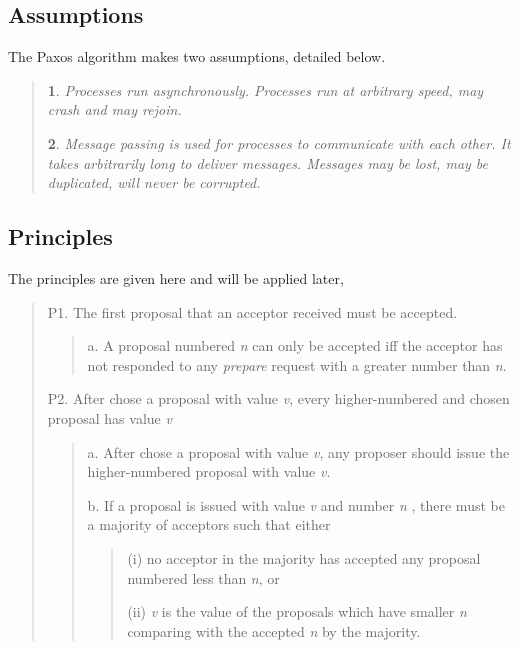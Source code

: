\documentclass[12pt, a4paper]{article}
\makeatletter
\newtheorem*{assumption*}{\assumptionnumber}
\providecommand{\assumptionnumber}{}
\newenvironment{assumption}[2]
 {
  \renewcommand{\assumptionnumber}{Assumption #1}
  \begin{assumption*}
  \protected@edef\@currentlabel{#1}
 }
 {
  \end{assumption*}
 }
\makeatother
\begin{document}
\subsection{Assumptions}
The Paxos algorithm makes two assumptions, detailed below.
\begin{quote}
  \begin{assumption}{1}{F}\label{as:1}
    Processes run asynchronously.
    Processes run at arbitrary speed, may crash and may rejoin.
  \end{assumption}
  \begin{assumption}{2}{F}\label{as:2}
    Message passing is used for processes to communicate with each other.
    It takes arbitrarily long to deliver messages.
    Messages may be lost, may be duplicated, will never be corrupted.
  \end{assumption}
\end{quote}
\subsection{Principles}

The principles are given here and will be applied later,
\begin{quote}
  P1. The first proposal that an acceptor received must be accepted.
  \begin{quote}
    a. A proposal numbered \textit{n} can only be accepted
      iff the acceptor has not responded to any \textit{prepare} request
      with a greater number than \textit{n}.
  \end{quote}
  P2. After chose a proposal with value \textit{v},
    every higher-numbered and chosen proposal has value \textit{v}
    \begin{quote}
      a. After chose a proposal with value \textit{v},
        any proposer should issue the higher-numbered proposal with value \textit{v}.

      b. If a proposal is issued with value \textit{v} and number \textit{n} ,
        there must be a majority of acceptors such that either
          \begin{quote}
            (i) no acceptor in the majority has accepted
              any proposal numbered less than \textit{n}, or

            (ii) \textit{v} is the value of the proposals which
            have smaller \textit{n} comparing with the
            accepted \textit{n}  by the majority.
          \end{quote}
  \end{quote}
\end{quote}
\end{document}
